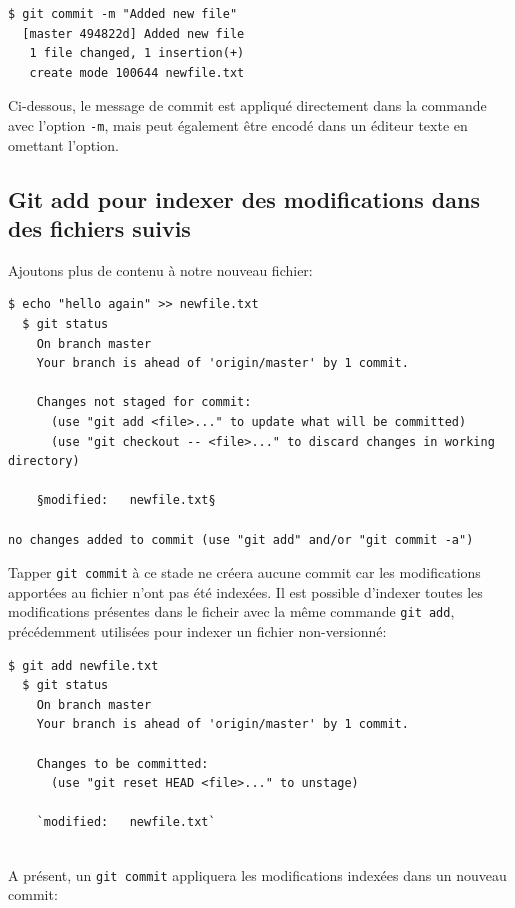 \documentclass{../../common/tufte-latex/tufte-handout}
\begin{document}
\begin{lstlisting}[style=BashInputStyle]
  $ git commit -m "Added new file"
  [master 494822d] Added new file
   1 file changed, 1 insertion(+)
   create mode 100644 newfile.txt
\end{lstlisting}

Ci-dessous, le message de commit est appliqué directement dans la commande avec l'option \texttt{-m}, mais peut également être encodé dans un éditeur texte en omettant l'option.

\subsection{Git add pour indexer des modifications dans des fichiers suivis}

Ajoutons plus de contenu à notre nouveau fichier:

\begin{lstlisting}[style=BashInputStyle]
  $ echo "hello again" >> newfile.txt
  $ git status
    On branch master
    Your branch is ahead of 'origin/master' by 1 commit.
  
    Changes not staged for commit:
      (use "git add <file>..." to update what will be committed)
      (use "git checkout -- <file>..." to discard changes in working directory)
   
    §modified:   newfile.txt§
   
no changes added to commit (use "git add" and/or "git commit -a")
\end{lstlisting}

Tapper \texttt{git commit} à ce stade ne créera aucune commit car les modifications apportées au fichier n'ont pas été indexées.
Il est possible d'indexer toutes les modifications présentes dans le ficheir avec la même commande \texttt{git add}, précédemment utilisées pour indexer un fichier non-versionné:

\begin{lstlisting}[style=BashInputStyle]
  $ git add newfile.txt
  $ git status
    On branch master
    Your branch is ahead of 'origin/master' by 1 commit.
  
    Changes to be committed:
      (use "git reset HEAD <file>..." to unstage)
  
    `modified:   newfile.txt`
 
\end{lstlisting}

A présent, un \texttt{git commit} appliquera les modifications indexées dans un nouveau commit:
\end{document}
